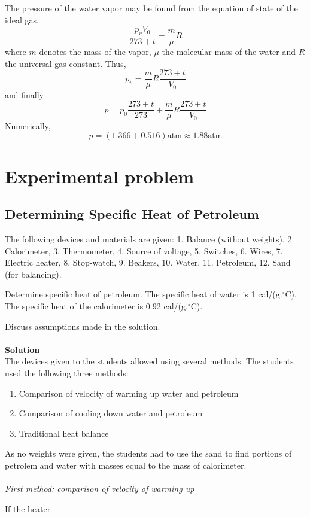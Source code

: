 \documentclass[12pt,a4paper]{book}
\begin{document}
	The pressure of the water vapor may be found from the equation of state of the ideal gas,
	\begin{equation*}
		\frac{p_vV_0}{273+t}=\frac{m}{\mu}R
	\end{equation*}
	where $m$ denotes the mass of the vapor, $\mu$ the molecular mass of the water and $R$ the universal gas constant. Thus,
	\begin{equation*}
		p_v=\frac{m}{\mu}R\frac{273+t}{V_0}
	\end{equation*}
	and finally
	\begin{equation}
		p=p_0\frac{273+t}{273}+\frac{m}{\mu}R\frac{273+t}{V_0}
	\end{equation}
	Numerically,
	\begin{equation*}
		p=(1.366+0.516)\text{atm}\approx1.88\text{atm}
	\end{equation*}
\section*{Experimental problem}
	\subsection*{Determining Specif\mbox{}ic Heat of Petroleum}
	The following devices and materials are given: 1. Balance (without weights), 2. Calorimeter, 3. Thermometer, 4. Source of voltage, 5. Switches, 6. Wires, 7. Electric heater, 8. Stop-watch, 9. Beakers, 10. Water, 11. Petroleum, 12. Sand (for balancing).\par
	Determine specif\mbox{}ic heat of petroleum. The specif\mbox{}ic heat of water is 1 cal/(g.$^{\circ}\mathrm{C}$). The specif\mbox{}ic heat of the calorimeter is 0.92 cal/(g.$^{\circ}\mathrm{C}$).\par
	Discuss assumptions made in the solution.\\ \\
	\textbf{Solution}\\
	The devices given to the students allowed using several methods. The students used the following three methods:
	\begin{enumerate}
		\item Comparison of velocity of warming up water and petroleum
		\item Comparison of cooling down water and petroleum
		\item Traditional heat balance
	\end{enumerate}\par
	As no weights were given, the students had to use the sand to f\mbox{}ind portions of petrolem and water with masses equal to the mass of calorimeter.\\ \\
	\noindent\emph{First method: comparison of velocity of warming up}\par
	If the heater
\end{document}
